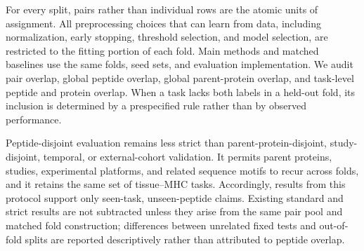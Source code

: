 For every split, pairs rather than individual rows are the atomic units of assignment. All preprocessing choices that can learn from data, including normalization, early stopping, threshold selection, and model selection, are restricted to the fitting portion of each fold. Main methods and matched baselines use the same folds, seed sets, and evaluation implementation. We audit pair overlap, global peptide overlap, global parent-protein overlap, and task-level peptide and protein overlap. When a task lacks both labels in a held-out fold, its inclusion is determined by a prespecified rule rather than by observed performance.

Peptide-disjoint evaluation remains less strict than parent-protein-disjoint, study-disjoint, temporal, or external-cohort validation. It permits parent proteins, studies, experimental platforms, and related sequence motifs to recur across folds, and it retains the same set of tissue--MHC tasks. Accordingly, results from this protocol support only seen-task, unseen-peptide claims. Existing standard and strict results are not subtracted unless they arise from the same pair pool and matched fold construction; differences between unrelated fixed tests and out-of-fold splits are reported descriptively rather than attributed to peptide overlap.
